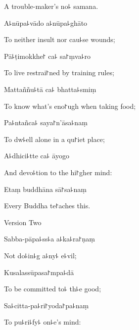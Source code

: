 \begin{english}
  A trouble-maker's no꜕ samana.
\end{english}

A꜕nūpa꜕vādo a꜕nūpa꜕ghāto

\begin{english}
  To neither insult nor cau꜕se wounds;
\end{english}

Pā꜕ṭimokkhe꜓ ca꜕ sa꜓ṃva꜕ro

\begin{english}
  To live restrai꜓ned by training rules;
\end{english}

Mattaññu꜕tā ca꜕ bhatta꜕smiṃ

\begin{english}
  To know what's eno꜓ugh when taking food;
\end{english}

Pa꜕ntañca꜕ saya꜓n'āsa꜕naṃ

\begin{english}
  To dw꜕ell alone in a qu꜓iet place;
\end{english}

A꜕dhici꜕tte ca꜕ āyogo

\begin{english}
  And devo꜕tion to the hi꜓gher mind:
\end{english}

Etaṃ buddhāna sā꜓sa꜕naṃ

\begin{english}
  Every Buddha te꜓aches this.
\end{english}

\clearpage

\begin{instruction}
  Version Two
\end{instruction}

Sabba-pāpa꜕ss꜕a a꜕ka꜕ra꜓ṇaṃ

\begin{english}
  Not do꜕in꜕g a꜕ny꜕ e꜕vil;
\end{english}

Kusalassūpasa꜓mpa꜕dā

\begin{english}
  To be committed to꜕ th꜕e good;
\end{english}

Sa꜕citta-pa꜕ri꜓yoda꜓pa꜕naṃ

\begin{english}
  To pu꜕ri꜕fy꜕ on꜕e's mind:
\end{english}

